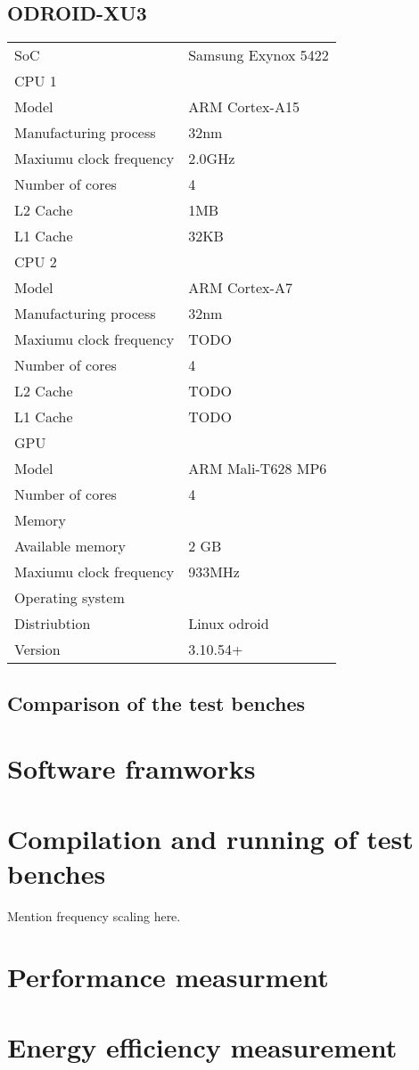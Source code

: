 \subsection{ODROID-XU3}
\begin{table}[h]
  \begin{tabular}{ll}
    SoC & Samsung Exynox 5422 \\
    CPU 1 &  \\
    Model & ARM Cortex-A15 \\
    Manufacturing process & 32nm \\
    Maxiumu clock frequency & 2.0GHz \\
    Number of cores & 4 \\
    L2 Cache & 1MB \\
    L1 Cache & 32KB \\
    CPU 2 &  \\
    Model & ARM Cortex-A7 \\
    Manufacturing process & 32nm \\
    Maxiumu clock frequency & TODO \\
    Number of cores & 4 \\
    L2 Cache & TODO \\
    L1 Cache & TODO \\
    GPU &  \\
    Model & ARM Mali-T628 MP6 \\
    Number of cores & 4 \\
    Memory &  \\
    Available memory & 2 GB \\
    Maxiumu clock frequency & 933MHz \\
    Operating system &  \\
    Distriubtion & Linux odroid \\
    Version & 3.10.54+
  \end{tabular}
\end{table}

\subsection{Comparison of the test benches}

\section{Software framworks}
\section{Compilation and running of test benches}
Mention frequency scaling here.
\section{Performance measurment}
\section{Energy efficiency measurement}

